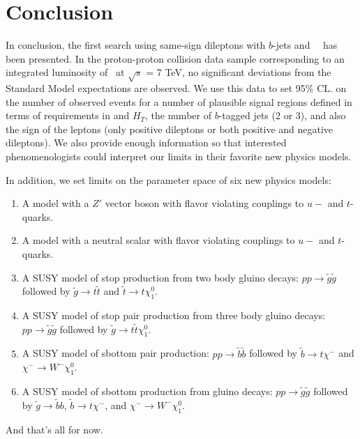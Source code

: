 \section{Conclusion}
\label{sec:conclusion}
In conclusion, the first search using same-sign dileptons with $b$-jets and \met~~has 
been presented. In the
proton-proton collision data sample corresponding to an integrated luminosity of 
 \intLumi~at $\sqrt{s}$ = 7 TeV,
no significant deviations from the Standard Model expectations are observed. 
We use this data to set 95\% CL. on the
number of observed events for a number of plausible signal regions
defined in terms of requirements in \met and $H_T$, the number of
$b$-tagged jets (2 or 3), and also the sign of the leptons (only positive dileptons
or both positive and negative dileptons).
We also provide enough information so that interested phenomenologists
could interpret our limits in their favorite new physics models.

In addition, we set limits on the parameter space of six new physics models:
\begin{enumerate}
\item A model with a $Z'$ vector boson with flavor violating couplings to $u-$ and $t$-quarks.

\item A model with a neutral scalar with flavor violating couplings to $u-$ and $t$-quarks.

\item A SUSY model of stop production from two body gluino decays: 
$pp \to \widetilde{g} \widetilde{g}$ followed by
$\widetilde{g} \to t\widetilde{t}$ and $\widetilde{t} \to t \chi_1^0$.

\item A SUSY model of stop pair production from three body gluino decays:
$pp \to \widetilde{g} \widetilde{g}$ followed by
$\widetilde{g} \to t\widetilde{t}\chi_1^0$.

\item A SUSY model of sbottom pair production: $pp \to \tilde{b}\tilde{b}$ followed
by $\tilde{b} \to t\chi^{-}$ and $\chi^{-} \to W^- \chi_1^0$.

\item A SUSY model of sbottom production from gluino decays:
$pp \to \widetilde{g} \widetilde{g}$ followed by
$\widetilde{g} \to \widetilde{b}b$,
$\widetilde{b} \to t\chi^-$, and $\chi^{-} \to W^- \chi_1^0$.
\end{enumerate}

And that's all for now.
